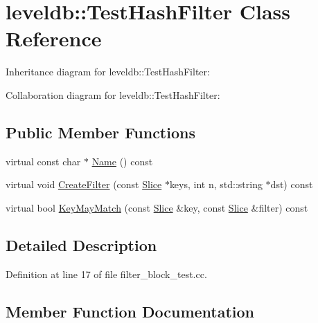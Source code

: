 \hypertarget{classleveldb_1_1_test_hash_filter}{}\section{leveldb\+:\+:Test\+Hash\+Filter Class Reference}
\label{classleveldb_1_1_test_hash_filter}


Inheritance diagram for leveldb\+:\+:Test\+Hash\+Filter\+:


Collaboration diagram for leveldb\+:\+:Test\+Hash\+Filter\+:
\subsection*{Public Member Functions}
\begin{DoxyCompactItemize}
\item 
virtual const char $\ast$ \hyperlink{classleveldb_1_1_test_hash_filter_a07700084322049647b7c788aa53d8269}{Name} () const 
\item 
virtual void \hyperlink{classleveldb_1_1_test_hash_filter_ad6d9fc5e8008a1a2bd3d22d21cef6645}{Create\+Filter} (const \hyperlink{classleveldb_1_1_slice}{Slice} $\ast$keys, int n, std\+::string $\ast$dst) const 
\item 
virtual bool \hyperlink{classleveldb_1_1_test_hash_filter_ace8fcf2f1ac682fb958ddd38c53efe08}{Key\+May\+Match} (const \hyperlink{classleveldb_1_1_slice}{Slice} \&key, const \hyperlink{classleveldb_1_1_slice}{Slice} \&filter) const 
\end{DoxyCompactItemize}


\subsection{Detailed Description}


Definition at line 17 of file filter\+\_\+block\+\_\+test.\+cc.



\subsection{Member Function Documentation}
\hypertarget{classleveldb_1_1_test_hash_filter_ad6d9fc5e8008a1a2bd3d22d21cef6645}{}
